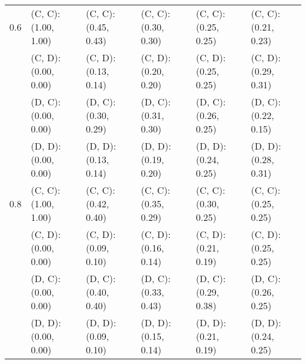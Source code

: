 \begin{tabular}{ l | l l l l l }
\hline 
0.6 & (C, C): (1.00, 1.00) & (C, C): (0.45, 0.43) & (C, C): (0.30, 0.30) & (C, C): (0.25, 0.25) & (C, C): (0.21, 0.23) \\ 
 & (C, D): (0.00, 0.00) & (C, D): (0.13, 0.14) & (C, D): (0.20, 0.20) & (C, D): (0.25, 0.25) & (C, D): (0.29, 0.31) \\ 
 & (D, C): (0.00, 0.00) & (D, C): (0.30, 0.29) & (D, C): (0.31, 0.30) & (D, C): (0.26, 0.25) & (D, C): (0.22, 0.15) \\ 
 & (D, D): (0.00, 0.00) & (D, D): (0.13, 0.14) & (D, D): (0.19, 0.20) & (D, D): (0.24, 0.25) & (D, D): (0.28, 0.31) \\ 
\hline 
0.8 & (C, C): (1.00, 1.00) & (C, C): (0.42, 0.40) & (C, C): (0.35, 0.29) & (C, C): (0.30, 0.25) & (C, C): (0.25, 0.25) \\ 
 & (C, D): (0.00, 0.00) & (C, D): (0.09, 0.10) & (C, D): (0.16, 0.14) & (C, D): (0.21, 0.19) & (C, D): (0.25, 0.25) \\ 
 & (D, C): (0.00, 0.00) & (D, C): (0.40, 0.40) & (D, C): (0.33, 0.43) & (D, C): (0.29, 0.38) & (D, C): (0.26, 0.25) \\ 
 & (D, D): (0.00, 0.00) & (D, D): (0.09, 0.10) & (D, D): (0.15, 0.14) & (D, D): (0.21, 0.19) & (D, D): (0.24, 0.25) \\ 

\end{tabular}





